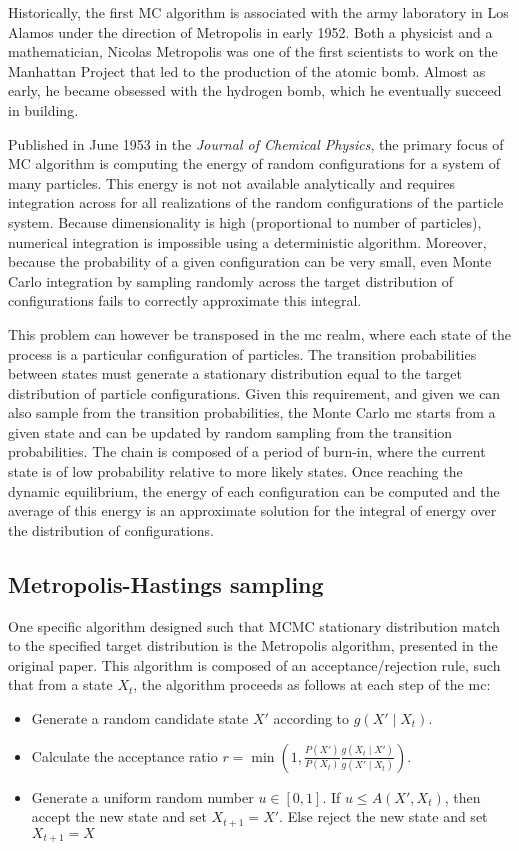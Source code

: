 Historically, the first \acrshort{MC} algorithm is associated with the army laboratory in Los Alamos under the direction of Metropolis in early 1952.
Both a physicist and a mathematician, Nicolas Metropolis was one of the first scientists to work on the Manhattan Project that led to the production of the atomic bomb.
Almost as early, he became obsessed with the hydrogen bomb, which he eventually succeed in building.

Published in June 1953 in the \textit{Journal of Chemical Physics}, the primary focus of \acrshort{MC} algorithm is computing the energy of random configurations for a system of many particles.
This energy is not not available analytically and requires integration across for all realizations of the random configurations of the particle system.
Because dimensionality is high (proportional to number of particles), numerical integration is impossible using a deterministic algorithm.
Moreover, because the probability of a given configuration can be very small, even Monte Carlo integration by sampling randomly across the target distribution of configurations fails to correctly approximate this integral.

This problem can however be transposed in the \gls{mc} realm, where each state of the process is a particular configuration of particles.
The {transition} probabilities between states must generate a stationary distribution equal to the target distribution of particle configurations.
Given this requirement, and given we can also sample from the {transition} probabilities, the Monte Carlo \gls{mc} starts from a given state and can be updated by random sampling from the {transition} probabilities.
The chain is composed of a period of burn-in, where the current state is of low probability relative to more likely states.
Once reaching the dynamic equilibrium, the energy of each configuration can be computed and the average of this energy is an approximate solution for the integral of energy over the distribution of configurations.

\subsection{Metropolis-Hastings sampling}

One specific algorithm designed such that MCMC stationary distribution match to the specified target distribution is the Metropolis algorithm, presented in the original paper.
This algorithm is composed of an acceptance/rejection rule, such that from a state $X_t$, the algorithm proceeds as follows at each step of the \gls{mc}:
\begin{itemize}
	\item Generate a random candidate state $X'$ according to $g(X'\mid X_t)$.
	\item Calculate the acceptance ratio $\displaystyle r=\min \left(1,{\frac {P(X')}{P(X_{t})}}{\frac {g(X_{t}\mid X')}{g(X'\mid X_{t})}}\right)$.
	\item Generate a uniform random number $u\in [0,1]$.
	If $u\leq A(X',X_{t})$, then accept the new state and set $X_{t+1}=X'$.
	Else reject the new state and set $X_{t+1}=X$
\end{itemize}

